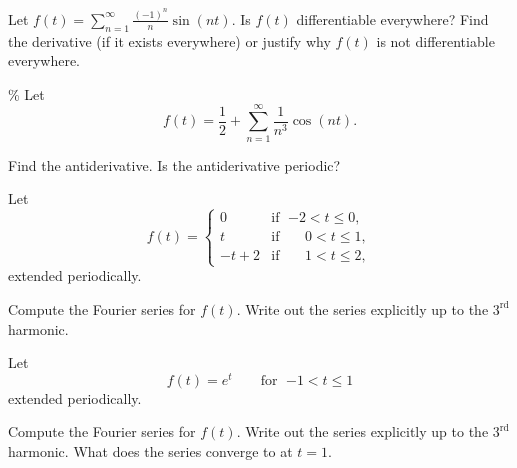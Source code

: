 \documentclass{ximera}
\begin{document}
\begin{exercise}
    Let $f(t) = \sum_{n=1}^\infty \frac{{(-1)}^n}{n} \sin (n t)$.  Is $f(t)$ differentiable everywhere?  Find the derivative (if it exists everywhere) or justify why $f(t)$ is not differentiable everywhere.
\end{exercise}

\begin{exercise}\%
    Let
    \begin{equation*}
        f(t) = \frac{1}{2} + \sum_{n=1}^\infty \frac{1}{n^3} \cos(n t) .
    \end{equation*}
    \begin{tasks}
        \task Find the antiderivative.
        \task Is the antiderivative periodic?
    \end{tasks}
\end{exercise}

\begin{exercise}
    Let
    \begin{equation*}
        f(t) =
        \begin{cases}
            0 & \text{if } \; {-2} < t \leq 0, \\
            t & \text{if } \; \phantom{-}0 < t \leq 1, \\
            -t+2 & \text{if } \; \phantom{-}1 < t \leq 2,
        \end{cases}
    \end{equation*}
    extended periodically.
    \begin{tasks}
        \task Compute the Fourier series for $f(t)$.
        \task Write out the series explicitly up to the $3^{\text{rd}}$ harmonic.
    \end{tasks}
\end{exercise}

\begin{exercise}
    Let
    \begin{equation*}
        f(t) = e^t \qquad \text{for } \; {-1} < t \leq 1
    \end{equation*}
    extended periodically.
    \begin{tasks}
        \task Compute the Fourier series for $f(t)$.
        \task Write out the series explicitly up to the $3^{\text{rd}}$ harmonic.
        \task What does the series converge to at $t=1$.
    \end{tasks}
\end{exercise}
\end{document}
